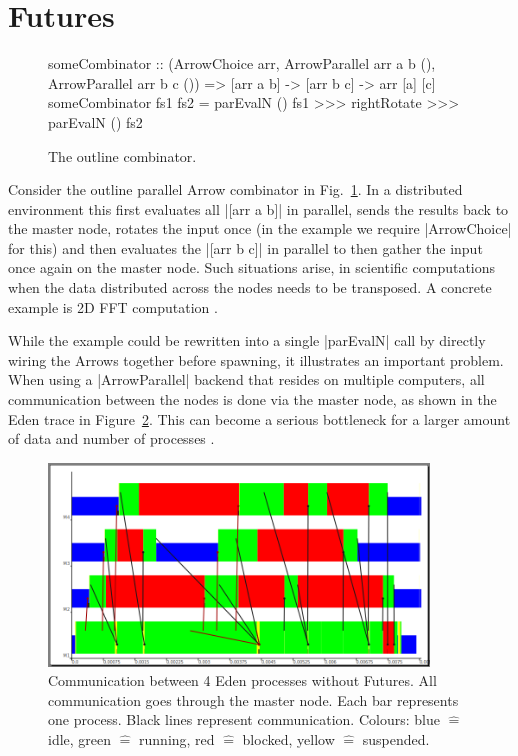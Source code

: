 \section{Futures} \label{sec:futures}\label{futures}
\begin{figure}[t]
\begin{code}
someCombinator :: (ArrowChoice arr,
	ArrowParallel arr a b (),
	ArrowParallel arr b c ()) =>
	[arr a b] -> [arr b c] -> arr [a] [c]
someCombinator fs1 fs2 =
	parEvalN () fs1 >>>
	rightRotate >>>
	parEvalN () fs2
\end{code}
\caption{The outline combinator.}
\label{fig:someCombinator}
\end{figure}

Consider the outline parallel Arrow combinator in Fig.~\ref{fig:someCombinator}. In a distributed environment this first evaluates all |[arr a b]| in parallel, sends the results back to the master node, rotates the input once (in the example we require |ArrowChoice| for this) and then evaluates the |[arr b c]| in parallel to then gather the input once again on the master node.
Such situations arise, \eg in scientific computations when the data distributed across the nodes needs to be transposed. A concrete example is 2D FFT computation \cite{Gorlatch,Berthold2009-fft}.

While the example could be rewritten into a single |parEvalN| call by directly wiring the Arrows together before spawning, it illustrates an important problem. When using a |ArrowParallel| backend that resides on multiple computers, all communication between the nodes is done via the master node, as shown in the Eden trace in Figure~\ref{fig:withoutFutures}. This can become a serious bottleneck
for a larger amount of data and number of processes \citep[as e.g.][showcases]{Berthold2009-fft}.
\begin{figure}[ht]
	\centering
	\includegraphics[width=0.9\textwidth]{images/withoutFutures}
	\caption[without Futures]{Communication between 4 Eden processes without Futures. All communication goes through the master node. Each bar represents one process. Black lines represent communication. Colours: blue $\hat{=}$ idle, green $\hat{=}$ running, red  $\hat{=}$ blocked, yellow $\hat{=}$ suspended.}
	\label{fig:withoutFutures}
\end{figure}

